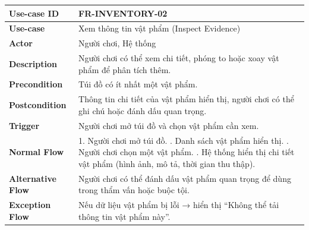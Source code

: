 \begin{table}[H]
\centering
\begin{tabular}{|p{4cm}|p{10cm}|}
\hline
\textbf{Use-case ID} & FR-INVENTORY-02 \\ \hline
\textbf{Use-case} & Xem thông tin vật phẩm (Inspect Evidence) \\ \hline
\textbf{Actor} & Người chơi, Hệ thống \\ \hline
\textbf{Description} & Người chơi có thể xem chi tiết, phóng to hoặc xoay vật phẩm để phân tích thêm. \\ \hline
\textbf{Precondition} & Túi đồ có ít nhất một vật phẩm. \\ \hline
\textbf{Postcondition} & Thông tin chi tiết của vật phẩm hiển thị, người chơi có thể ghi chú hoặc đánh dấu quan trọng. \\ \hline
\textbf{Trigger} & Người chơi mở túi đồ và chọn vật phẩm cần xem. \\ \hline
\textbf{Normal Flow} &
1. Người chơi mở túi đồ. \newline
2. Danh sách vật phẩm hiển thị. \newline
3. Người chơi chọn một vật phẩm. \newline
4. Hệ thống hiển thị chi tiết vật phẩm (hình ảnh, mô tả, thời gian thu thập). \\ \hline
\textbf{Alternative Flow} &
Người chơi có thể đánh dấu vật phẩm quan trọng để dùng trong thẩm vấn hoặc buộc tội. \\ \hline
\textbf{Exception Flow} &
Nếu dữ liệu vật phẩm bị lỗi → hiển thị “Không thể tải thông tin vật phẩm này”. \\ \hline
\end{tabular}
\end{table}


